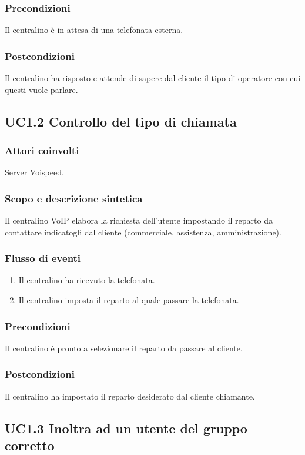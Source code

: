 \subsubsection*{Precondizioni}  Il centralino \` e in attesa di una telefonata esterna.
\subsubsection*{Postcondizioni} Il centralino ha risposto e attende di sapere dal cliente il tipo di operatore con cui questi vuole parlare.

\subsection*{UC1.2 Controllo del tipo di chiamata}
\subsubsection*{Attori coinvolti} Server Voispeed.
\subsubsection*{Scopo e descrizione sintetica}
Il centralino VoIP elabora la richiesta dell'utente impostando il reparto da contattare indicatogli dal cliente (commerciale, assistenza, amministrazione).
\subsubsection*{Flusso di eventi}
\begin{enumerate}
\item Il centralino ha ricevuto la telefonata.
\item Il centralino imposta il reparto al quale passare la telefonata.
\end{enumerate}
\subsubsection*{Precondizioni} Il centralino \` e pronto a selezionare il reparto da passare al cliente.
\subsubsection*{Postcondizioni} Il centralino ha impostato il reparto desiderato dal cliente chiamante.

\subsection*{UC1.3 Inoltra ad un utente del gruppo corretto}

